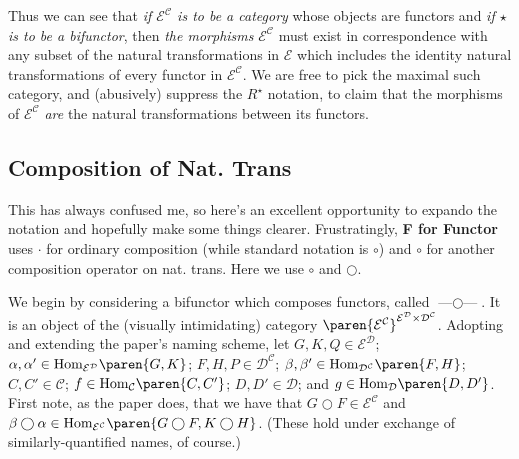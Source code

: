 \documentclass[letterpaper]{article}
\newcommand{\Hom}[3]{\textrm{Hom}_{#1}{\paren{#2,#3}}}
\begin{document}
Thus we can see that {\em if $\mathcal{E}^\mathcal{C}$ is to be a category}
whose objects are functors and {\em if $\star$ is to be a bifunctor}, then
{\em the morphisms} $\mathcal{E}^\mathcal{C}$ must exist in correspondence
with any subset of the natural transformations in $\mathcal{E}$ which
includes the identity natural transformations of every functor in
$\mathcal{E}^{\mathcal{C}}$.  We are free to pick the maximal such category,
and (abusively) suppress the $R^\star$ notation, to claim that the morphisms
of $\mathcal{E}^{\mathcal{C}}$ {\em are} the natural transformations between
its functors.

\subsection{Composition of Nat. Trans}

This has always confused me, so here's an excellent opportunity to expando
the notation and hopefully make some things clearer.  Frustratingly, {\bf F
for Functor} uses $\cdot$ for ordinary composition (while standard notation
is $\circ$) and $\circ$ for another composition operator on nat. trans.
Here we use $\circ$ and $\bigcirc$.

We begin by considering a bifunctor which composes functors, called
$\textrm{---} \bigcirc \textrm{---}$.  It is an object of the (visually
intimidating) category
$\paren{\mathcal{E}^\mathcal{C}}^{\mathcal{E}^{\mathcal{D}} \times
\mathcal{D}^{\mathcal{C}}}$.  Adopting and extending the paper's naming
scheme, let $G,K,Q \in \mathcal{E}^{\mathcal{D}}$; $\alpha,\alpha' \in
\Hom{\mathcal{E}^{\mathcal{D}}}{G}{K}$; $F,H,P \in
\mathcal{D}^{\mathcal{C}}$; $\beta,\beta' \in
\Hom{\mathcal{D}^{\mathcal{C}}}{F}{H}$; $C,C' \in \mathcal{C}$; $f \in
\Hom{\mathcal{C}}{C}{C'}$; $D,D' \in \mathcal{D}$; and $g \in
\Hom{\mathcal{D}}{D}{D'}$.  First note, as the paper does, that we have that
$G \bigcirc F \in \mathcal{E}^{\mathcal{C}}$ and $\beta \bigcirc \alpha \in
\Hom{\mathcal{E}^{\mathcal{C}}}{G \bigcirc F}{K \bigcirc H}$. (These hold
under exchange of similarly-quantified names, of course.)
\end{document}
